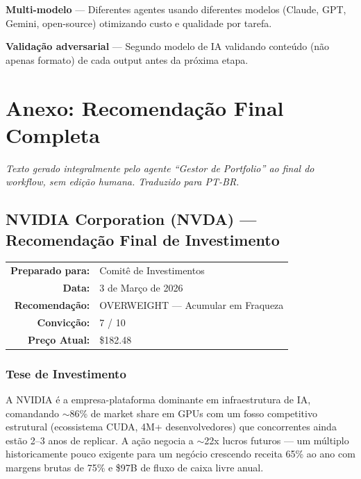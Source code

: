 \documentclass[11pt,a4paper]{article}
\begin{document}
\textbf{Multi-modelo} --- Diferentes agentes usando diferentes modelos (Claude, GPT, Gemini, open-source) otimizando custo e qualidade por tarefa.

\textbf{Valida\c{c}\~ao adversarial} --- Segundo modelo de IA validando conte\'udo (n\~ao apenas formato) de cada output antes da pr\'oxima etapa.

\newpage


\section*{Anexo: Recomenda\c{c}\~ao Final Completa}

\begin{center}
\small\textit{Texto gerado integralmente pelo agente ``Gestor de Portfolio'' ao final do workflow, sem edi\c{c}\~ao humana. Traduzido para PT-BR.}
\end{center}

\subsection{NVIDIA Corporation (NVDA) --- Recomenda\c{c}\~ao Final de Investimento}

\noindent
\begin{tabular}{rl}
\textbf{Preparado para:} & Comit\^e de Investimentos \\
\textbf{Data:} & 3 de Mar\c{c}o de 2026 \\
\textbf{Recomenda\c{c}\~ao:} & OVERWEIGHT --- Acumular em Fraqueza \\
\textbf{Convic\c{c}\~ao:} & 7 / 10 \\
\textbf{Pre\c{c}o Atual:} & \$182.48 \\
\end{tabular}

\subsubsection{Tese de Investimento}

A NVIDIA \'e a empresa-plataforma dominante em infraestrutura de IA, comandando $\sim$86\% de market share em GPUs com um fosso competitivo estrutural (ecossistema CUDA, 4M+ desenvolvedores) que concorrentes ainda est\~ao 2--3 anos de replicar. A a\c{c}\~ao negocia a $\sim$22x lucros futuros --- um m\'ultiplo historicamente pouco exigente para um neg\'ocio crescendo receita 65\% ao ano com margens brutas de 75\% e \$97B de fluxo de caixa livre anual.
\end{document}

